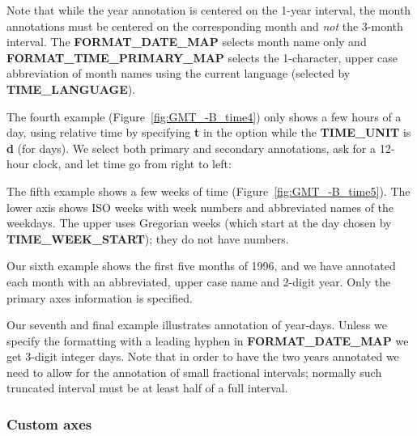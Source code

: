 
Note that while the year annotation is centered on the 1-year interval, the month annotations must be centered
on the corresponding month and \emph{not} the 3-month interval.  The \textbf{FORMAT\_DATE\_MAP} selects month
name only and \textbf{FORMAT\_TIME\_PRIMARY\_MAP} selects the 1-character, upper case abbreviation of month names using
the current language (selected by \textbf{TIME\_LANGUAGE}).

The fourth example (Figure~\ref{fig:GMT_-B_time4}) only shows a few hours of a day, using relative time by
specifying \textbf{t} in the  option while the \textbf{TIME\_UNIT} is \textbf{d} (for days).
We select both primary and
secondary annotations, ask for a 12-hour clock, and let time go from right to left:


The fifth example shows a few weeks of time (Figure~\ref{fig:GMT_-B_time5}).  The lower axis shows ISO weeks with
week numbers and abbreviated names of the weekdays.   The upper uses Gregorian weeks (which start at the day chosen
by \textbf{TIME\_WEEK\_START}); they do not have numbers.


Our sixth example shows the first five months of 1996, and we have annotated each month with an abbreviated, upper case
name and 2-digit year.  Only the primary axes information is specified.



Our seventh and final example illustrates annotation of year-days.  Unless we specify the formatting with a leading hyphen
in  \textbf{FORMAT\_DATE\_MAP} we get 3-digit integer days.  Note that in order to have the two years
annotated we need to allow for the annotation of small fractional intervals; normally such truncated interval must
be at least half of a full interval.



\subsubsection{Custom axes}

